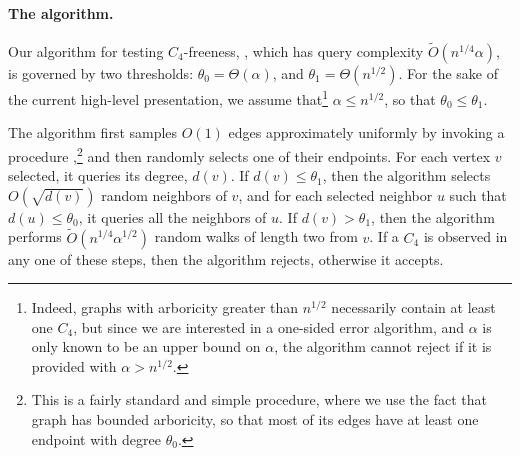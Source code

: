 \documentclass{article}
\newcommand{\eps}{\epsilon}
\newcommand{\commentt}[1]{ {}}
\newcommand{\SodaReb}[1]{{ #1}}
\newcommand{\ICALPCR}[1]{{#1}}
\newcommand{\SelectEdge}{\hyperref[alg:select-edge]{\color{black}{\sf Select-an-Edge}}}
\newcommand{\TestCfour}{\hyperref[alg:C4]{\color{black}{\sf Test-$C_4$-freeness}}}
\begin{document}
\paragraph{The algorithm.}
Our algorithm for testing $C_4$-freeness,  \TestCfour, \ICALPCR{which has query complexity $\widetilde{O}(n^{1/4}\alpha)$,}  
is governed by two thresholds: $\theta_0=\Theta(\alpha)$, and $\theta_1=\Theta(n^{1/2})$. 
For the sake of the current high-level presentation, 
we 
assume that\footnote{Indeed, graphs with arboricity greater than $n^{1/2}$ necessarily contain at least one $C_4$, but since we are interested in a one-sided error algorithm, and $\alpha$ is only known to be an upper bound on $\alpha$, the algorithm cannot reject if it is provided with $\alpha > n^{1/2}$.} $\alpha \leq n^{1/2}$, 
so that $\theta_0\leq \theta_1$.

The algorithm first samples $O(1)$ edges approximately uniformly by invoking a procedure
\SelectEdge,\footnote{\SodaReb{This is a fairly standard and simple procedure, where we use the fact that graph has bounded arboricity, so that most of its edges have at least one endpoint with degree $\theta_0$.}}
and then randomly selects one of their endpoints. For each vertex $v$ selected, it queries its degree, $d(v)$. If $d(v)\leq \theta_1$, then the algorithm selects $O(\sqrt{d(v)})$ random neighbors of $v$, and for each selected neighbor $u$ such that $d(u)\leq \theta_0$,  it queries all the neighbors of $u$. If $d(v)>\theta_1$, then the algorithm
performs $\widetilde{O}(n^{1/4}\alpha^{1/2})$ random walks of length two from $v$. If a $C_4$ is observed in any one of these steps, then the algorithm rejects, otherwise it accepts.
\end{document}
